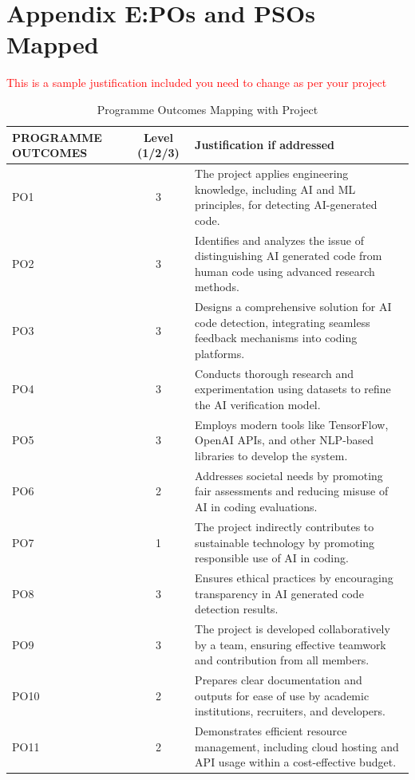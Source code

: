\section {Appendix E:POs and PSOs Mapped}
{\textcolor{red}{This is a  sample justification included you need to change as per your project}}
\begin{table}[h!]
	\centering
	\renewcommand{\arraystretch}{1.3} %
	\setlength{\tabcolsep}{6pt}       %
	\begin{tabular}{|p{3cm}|c|p{8cm}|}
		\hline
		\textbf{PROGRAMME OUTCOMES} & \textbf{Level (1/2/3)} & \textbf{Justification if addressed} \\
		\hline
		PO1 & 3 & The project applies engineering knowledge, including AI and ML principles, for detecting AI-generated code. \\
		\hline
		PO2 & 3 & Identifies and analyzes the issue of distinguishing AI generated code from human code using advanced research methods. \\
		\hline
		PO3 & 3 & Designs a comprehensive solution for AI code detection, integrating seamless feedback mechanisms into coding platforms. \\
		\hline
		PO4 & 3 & Conducts thorough research and experimentation using datasets to refine the AI verification model. \\
		\hline
		PO5 & 3 & Employs modern tools like TensorFlow, OpenAI APIs, and other NLP-based libraries to develop the system. \\
		\hline
		PO6 & 2 & Addresses societal needs by promoting fair assessments and reducing misuse of AI in coding evaluations. \\
		\hline
		PO7 & 1 & The project indirectly contributes to sustainable technology by promoting responsible use of AI in coding. \\
		\hline
		PO8 & 3 & Ensures ethical practices by encouraging transparency in AI generated code detection results. \\
		\hline
		PO9 & 3 & The project is developed collaboratively by a team, ensuring effective teamwork and contribution from all members. \\
		\hline
		PO10 & 2 & Prepares clear documentation and outputs for ease of use by academic institutions, recruiters, and developers. \\
		\hline
		PO11 & 2 & Demonstrates efficient resource management, including cloud hosting and API usage within a cost-effective budget. \\
		\hline
	\end{tabular}
	\caption{Programme Outcomes Mapping with Project}
\end{table}

